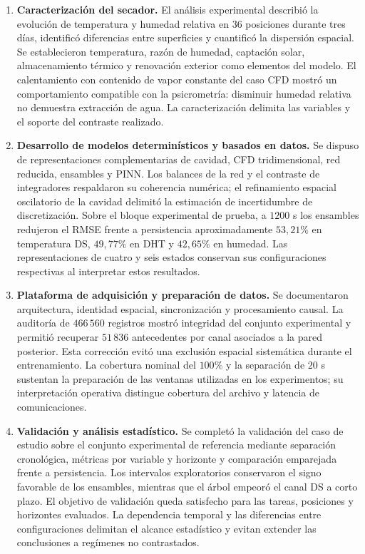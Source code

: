 \begin{enumerate}
\item \textbf{Caracterización del secador.} El análisis experimental describió la evolución de temperatura y humedad relativa en $36$ posiciones durante tres días, identificó diferencias entre superficies y cuantificó la dispersión espacial. Se establecieron temperatura, razón de humedad, captación solar, almacenamiento térmico y renovación exterior como elementos del modelo. El calentamiento con contenido de vapor constante del caso CFD mostró un comportamiento compatible con la psicrometría: disminuir humedad relativa no demuestra extracción de agua. La caracterización delimita las variables y el soporte del contraste realizado.

\item \textbf{Desarrollo de modelos determinísticos y basados en datos.} Se dispuso de representaciones complementarias de cavidad, CFD tridimensional, red reducida, ensambles y PINN. Los balances de la red y el contraste de integradores respaldaron su coherencia numérica; el refinamiento espacial oscilatorio de la cavidad delimitó la estimación de incertidumbre de discretización. Sobre el bloque experimental de prueba, a $1200$ s los ensambles redujeron el RMSE frente a persistencia aproximadamente $53{,}21\%$ en temperatura DS, $49{,}77\%$ en DHT y $42{,}65\%$ en humedad. Las representaciones de cuatro y seis estados conservan sus configuraciones respectivas al interpretar estos resultados.

\item \textbf{Plataforma de adquisición y preparación de datos.} Se documentaron arquitectura, identidad espacial, sincronización y procesamiento causal. La auditoría de $466\,560$ registros mostró integridad del conjunto experimental y permitió recuperar $51\,836$ antecedentes por canal asociados a la pared posterior. Esta corrección evitó una exclusión espacial sistemática durante el entrenamiento. La cobertura nominal del $100\%$ y la separación de $20$ s sustentan la preparación de las ventanas utilizadas en los experimentos; su interpretación operativa distingue cobertura del archivo y latencia de comunicaciones.

\item \textbf{Validación y análisis estadístico.} Se completó la validación del caso de estudio sobre el conjunto experimental de referencia mediante separación cronológica, métricas por variable y horizonte y comparación emparejada frente a persistencia. Los intervalos exploratorios conservaron el signo favorable de los ensambles, mientras que el árbol empeoró el canal DS a corto plazo. El objetivo de validación queda satisfecho para las tareas, posiciones y horizontes evaluados. La dependencia temporal y las diferencias entre configuraciones delimitan el alcance estadístico y evitan extender las conclusiones a regímenes no contrastados.


\end{enumerate}
